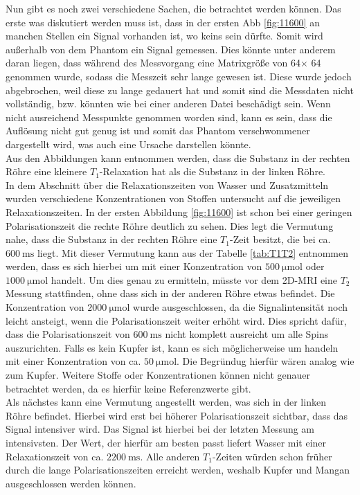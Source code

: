 Nun gibt es noch zwei verschiedene Sachen, die betrachtet werden können. Das erste was diskutiert werden muss ist, dass in der ersten Abb \ref{fig:11600} an manchen Stellen ein Signal vorhanden ist, wo keins sein dürfte. Somit wird außerhalb von dem Phantom ein Signal gemessen. Dies könnte unter anderem daran liegen, dass während des Messvorgang eine Matrixgröße von 64$\times$ 64 genommen wurde, sodass die Messzeit sehr lange gewesen ist. Diese wurde jedoch abgebrochen, weil diese zu lange gedauert hat und somit sind die Messdaten nicht vollständig, bzw. könnten wie bei einer anderen Datei beschädigt sein. Wenn nicht ausreichend Messpunkte genommen worden sind, kann es sein, dass die Auflösung nicht gut genug ist und somit das Phantom verschwommener dargestellt wird, was auch eine Ursache darstellen könnte.\\
Aus den Abbildungen kann entnommen werden, dass die Substanz in der rechten Röhre eine kleinere $T_1$-Relaxation hat als die Substanz in der linken Röhre.\\
In dem Abschnitt über die \glqq Relaxationszeiten von Wasser und Zusatzmitteln\grqq \, wurden verschiedene Konzentrationen von Stoffen untersucht auf die jeweiligen Relaxationszeiten. In der ersten Abbildung \ref{fig:11600} ist schon bei einer geringen Polarisationszeit die rechte Röhre deutlich zu sehen. Dies legt die Vermutung nahe, dass die Substanz in der  rechten Röhre eine $T_1$-Zeit besitzt, die bei ca. $\SI{600}{\milli\second}$ liegt. Mit dieser Vermutung kann aus der Tabelle \ref{tab:T1T2} entnommen werden, dass es sich hierbei um  mit einer Konzentration von $\SI{500}{\micro\mole}$ oder 
$\SI{1000}{\micro\mole}$ handelt. Um dies genau zu ermitteln, müsste vor dem 2D-MRI 
eine $T_2$ Messung stattfinden, ohne dass sich in der anderen Röhre etwas befindet. Die Konzentration von $\SI{2000}{\micro\mole}$ wurde ausgeschlossen, da die Signalintensität noch leicht ansteigt, wenn die Polarisationszeit weiter erhöht wird. Dies spricht dafür, dass die Polarisationszeit von $\SI{600}{\milli\second}$ nicht komplett ausreicht um alle Spins auszurichten. Falls es kein Kupfer ist, kann es sich möglicherweise um  handeln mit einer Konzentration von ca. $\SI{50}{\micro\mole}$. Die Begründug hierfür wären analog wie zum Kupfer. Weitere Stoffe oder Konzentrationen können nicht genauer betrachtet werden, da es hierfür keine Referenzwerte gibt.\\
Als nächstes kann eine Vermutung angestellt werden, was sich in der linken Röhre befindet. Hierbei wird erst bei höherer Polarisationszeit sichtbar, dass das Signal intensiver wird. Das Signal ist hierbei bei der letzten Messung am intensivsten. Der Wert, der hierfür am besten passt liefert Wasser mit einer Relaxationszeit von ca. $\SI{2200}{\milli\second}$. Alle anderen $T_1$-Zeiten würden schon früher durch die lange Polarisationszeiten erreicht werden, weshalb Kupfer und Mangan ausgeschlossen werden können.\\



